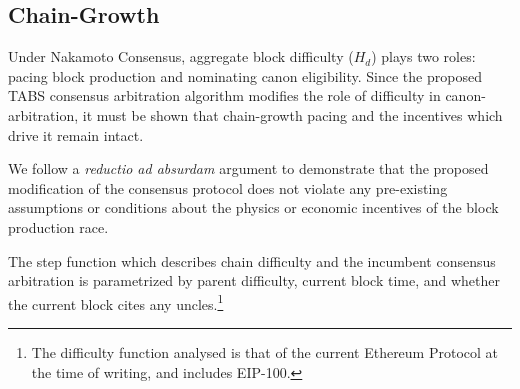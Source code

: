 \documentclass[11pt]{article}
\theoremstyle{plain}
\begin{document}
{%
%


%
%
%

\subsection{\normalsize{Chain-Growth}}

Under Nakamoto Consensus, aggregate block difficulty ($H_d$) plays two roles:
pacing block production and nominating canon eligibility.
Since the proposed TABS consensus arbitration algorithm modifies the role of difficulty in canon-arbitration,
it must be shown that chain-growth pacing and the incentives which drive it remain intact.

We follow a \textit{reductio ad absurdam} argument to demonstrate that the proposed modification
of the consensus protocol does not violate any pre-existing assumptions or conditions about the
physics or economic incentives of the block production race.


The step function which describes chain difficulty and the incumbent consensus arbitration is parametrized by
parent difficulty, current block time, and whether the current block cites any uncles.\footnote{
    The difficulty function analysed is that of the current Ethereum Protocol at the time of writing,
    and includes EIP-100.
}

}
\end{document}
